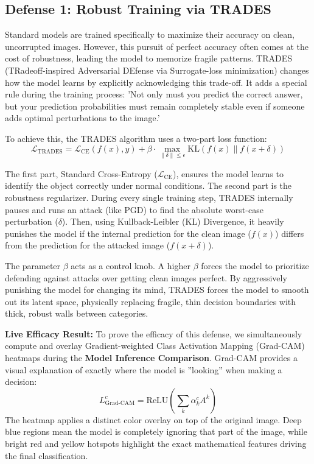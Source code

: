 \documentclass[12pt, a4paper]{article}
\begin{document}
\subsection{Defense 1: Robust Training via TRADES}
Standard models are trained specifically to maximize their accuracy on clean, uncorrupted images. However, this pursuit of perfect accuracy often comes at the cost of robustness, leading the model to memorize fragile patterns. TRADES (TRadeoff-inspired Adversarial DEfense via Surrogate-loss minimization) \cite{zhang2019theoretically} changes how the model learns by explicitly acknowledging this trade-off. It adds a special rule during the training process: 'Not only must you predict the correct answer, but your prediction probabilities must remain completely stable even if someone adds optimal perturbations to the image.'

To achieve this, the TRADES algorithm uses a two-part loss function:
\begin{equation}
\mathcal{L}_{\text{TRADES}} = \mathcal{L}_{\text{CE}}(f(x), y) + \beta \cdot \max_{\|\delta\| \le \epsilon} \text{KL}(f(x) \| f(x+\delta))
\end{equation}

The first part, Standard Cross-Entropy ($\mathcal{L}_{\text{CE}}$), ensures the model learns to identify the object correctly under normal conditions. 
The second part is the robustness regularizer. During every single training step, TRADES internally pauses and runs an attack (like PGD) to find the absolute worst-case perturbation ($\delta$). Then, using Kullback-Leibler (KL) Divergence, it heavily punishes the model if the internal prediction for the clean image ($f(x)$) differs from the prediction for the attacked image ($f(x+\delta)$). 

The parameter $\beta$ acts as a control knob. A higher $\beta$ forces the model to prioritize defending against attacks over getting clean images perfect. By aggressively punishing the model for changing its mind, TRADES forces the model to smooth out its latent space, physically replacing fragile, thin decision boundaries with thick, robust walls between categories.

\vspace{0.3cm}
\textbf{Live Efficacy Result:} To prove the efficacy of this defense, we simultaneously compute and overlay Gradient-weighted Class Activation Mapping (Grad-CAM) heatmaps during the \textbf{Model Inference Comparison}. Grad-CAM provides a visual explanation of exactly where the model is ''looking'' when making a decision:
\begin{equation}
L^c_{\text{Grad-CAM}} = \text{ReLU} \left( \sum_k \alpha_k^c A^k \right)
\end{equation}
The heatmap applies a distinct color overlay on top of the original image. Deep blue regions mean the model is completely ignoring that part of the image, while bright red and yellow hotspots highlight the exact mathematical features driving the final classification. 
\end{document}
